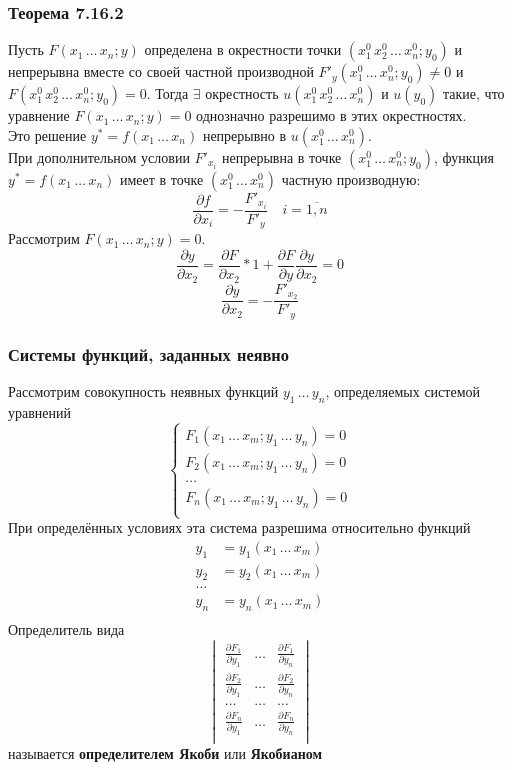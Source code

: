 \documentclass[12pt]{article}
\begin{document}
    \subsubsection*{Теорема 7.16.2}\label{th:7.16.2}
    Пусть $F(x_1\, \dots\, x_n; y)$ определена в окрестности точки $(x^0_1\, x^0_2\, \dots\, x^0_n; y_0)$ и непрерывна вместе со своей частной производной $F'_y(x^0_1\, \dots\, x^0_n; y_0) \ne 0$ и $F(x^0_1\, x^0_2\, \dots\, x^0_n; y_0) = 0$. Тогда $\exists$ окрестность $u(x^0_1\, x^0_2\, \dots\, x^0_n)$ и $u(y_0)$ такие, что уравнение $F(x_1\, \dots\, x_n; y) = 0$ однозначно разрешимо в этих окрестностях.\\
    Это решение $y^* = f(x_1\, \dots\, x_n)$ непрерывно в $u(x^0_1\, \dots\, x^0_n)$.\\
    При дополнительном условии $F'_{x_i}$ непрерывна в точке $(x^0_1\, \dots\, x^0_n; y_0)$, функция $y^* = f(x_1\, \dots\, x_n)$ имеет в точке $(x^0_1\, \dots\, x^0_n)$ частную производную:
    \[ \frac{\partial f}{\partial x_i} = -\frac{F'_{x_i}}{F'_{y}} \quad i = \overline{1,n} \]
    Рассмотрим $F(x_1\, \dots\, x_n; y) = 0$.
    \[ \frac{\partial y}{\partial x_2} = \frac{\partial F}{\partial x_2} * 1 + \frac{\partial F}{\partial y}\frac{\partial y}{\partial x_2} = 0 \]
    \[ \frac{\partial y}{\partial x_2} = -\frac{F'_{x_2}}{F'_y} \]
    \subsubsection*{Системы функций, заданных неявно}\noindent
    Рассмотрим совокупность неявных функций $y_1\, \dots\, y_n$, определяемых системой уравнений
    \[ \begin{cases}
        F_1(x_1\, \dots\, x_m; y_1\, \dots\, y_n) = 0\\
        F_2(x_1\, \dots\, x_m; y_1\, \dots\, y_n) = 0\\
        \dots\\
        F_n(x_1\, \dots\, x_m; y_1\, \dots\, y_n) = 0\\
    \end{cases} \]
    При определённых условиях эта система разрешима относительно функций
    \[ \begin{aligned}
        y_1 &= y_1(x_1\, \dots\, x_m)\\
        y_2 &= y_2(x_1\, \dots\, x_m)\\
        \dots\\
        y_n &= y_n(x_1\, \dots\, x_m)\\
    \end{aligned} \]
    Определитель вида
    \[ 
        \begin{vmatrix}
            \frac{\partial F_1}{\partial y_1} & \dots & \frac{\partial F_1}{\partial y_n}\\
            \frac{\partial F_2}{\partial y_1} & \dots & \frac{\partial F_2}{\partial y_n}\\
            \dots & \dots & \dots\\
            \frac{\partial F_n}{\partial y_1} & \dots & \frac{\partial F_n}{\partial y_n}\\
        \end{vmatrix}
    \]
    называется \textbf{определителем Якоби} или \textbf{Якобианом}
\end{document}
